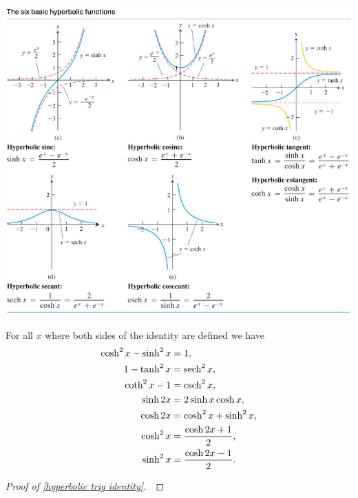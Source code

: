 \newpage

\includegraphics[width=6.5in]{img/hyperbolic_graphs}

\newpage

\begin{theorem}
For all $x$ where both sides of the identity are defined we have 
\begin{align}
\cosh^2 x -\sinh^2 x &= 1, \label{hyperbolic trig identity}\\ 
1-\tanh^2x &=\operatorname{sech}^2 x,\\
\coth^2 x -1&=\operatorname{csch}^2 x,\\
\sinh 2x &= 2\sinh x\cosh x,\\
\cosh 2x &=\cosh^2x + \sinh^2 x,\\
\cosh^2 x&=\frac{\cosh 2x + 1}{2},\\
\sinh^2 x&=\frac{\cosh 2x - 1}{2}.
\end{align}
\end{theorem}
\ifdefined\SOLUTION
{}
\else
\begin{proof}[Proof of \eqref{hyperbolic trig identity}]\,

\vspace{5in}
\end{proof}
\fi
\newpage

